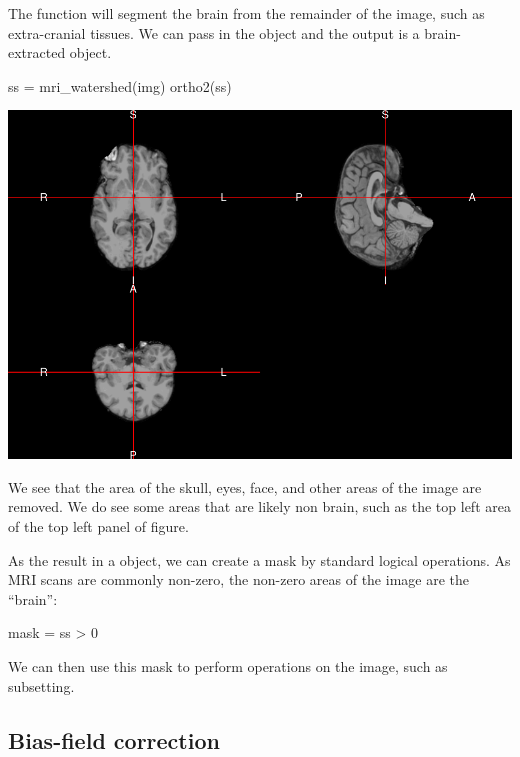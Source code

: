 The  function will segment the brain from the
remainder of the image, such as extra-cranial tissues. We can pass in
the  object and the output is a brain-extracted 
object.

\begin{Schunk}
\begin{Sinput}
ss = mri_watershed(img)
ortho2(ss)
\end{Sinput}

\includegraphics{Freesurfer_files/figure-latex/watershed-1} \end{Schunk}

We see that the area of the skull, eyes, face, and other areas of the
image are removed. We do see some areas that are likely non brain, such
as the top left area of the top left panel of figure.

As the result in a  object, we can create a mask by standard
logical operations. As MRI scans are commonly non-zero, the non-zero
areas of the image are the ``brain'':

\begin{Schunk}
\begin{Sinput}
mask = ss > 0
\end{Sinput}
\end{Schunk}

We can then use this mask to perform operations on the image, such as
subsetting.

\subsection{Bias-field correction}

